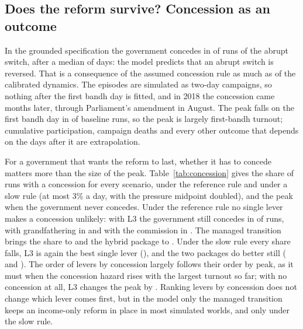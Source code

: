 \documentclass[11pt,a4paper]{article}
\begin{document}
\subsection{Does the reform survive? Concession as an outcome}
\label{sec:concession}
In the grounded specification the government concedes in \ConcessionReferenceBaselineShare{} of runs of the abrupt switch, after a median of \ConcessionReferenceBaselineDay{} days: the model predicts that an abrupt switch is reversed. That is a consequence of the assumed concession rule as much as of the calibrated dynamics. The episodes are simulated as two-day campaigns, so nothing after the first bandh day is fitted, and in 2018 the concession came months later, through Parliament's amendment in August. The peak falls on the first bandh day in \ConcessionReferencePeakOnFirstBandh{} of baseline runs, so the peak is largely first-bandh turnout; cumulative participation, campaign deaths and every other outcome that depends on the days after it are extrapolation.

For a government that wants the reform to last, whether it has to concede matters more than the size of the peak. Table~\ref{tab:concession} gives the share of runs with a concession for every scenario, under the reference rule and under a slow rule (at most 3\% a day, with the pressure midpoint doubled), and the peak when the government never concedes. Under the reference rule no single lever makes a concession unlikely: with L3 the government still concedes in \ConcessionReferenceShareLThree{} of runs, with grandfathering in \ConcessionReferenceShareLOne{} and with the commission in \ConcessionReferenceShareLFive. The managed transition brings the share to \ConcessionReferenceShareCOne{} and the hybrid package to \ConcessionReferenceShareCTwo. Under the slow rule every share falls, L3 is again the best single lever (\ConcessionSlowShareLThree), and the two packages do better still (\ConcessionSlowShareCOne{} and \ConcessionSlowShareCTwo). The order of levers by concession largely follows their order by peak, as it must when the concession hazard rises with the largest turnout so far; with no concession at all, L3 changes the peak by \ConcessionNonePeakLThree. Ranking levers by concession does not change which lever comes first, but in the model only the managed transition keeps an income-only reform in place in most simulated worlds, and only under the slow rule.
\end{document}
